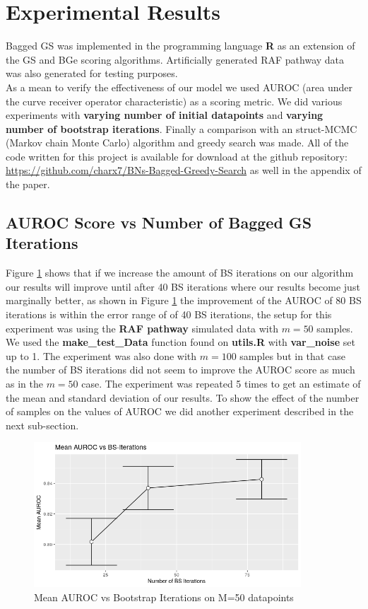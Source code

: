 \documentclass{article}
\begin{document}
	\section{Experimental Results}
	Bagged GS was implemented in the programming language \textbf{R} as an
	extension of the GS and BGe scoring algorithms. Artificially generated RAF
	pathway data was also generated for testing purposes. \\
	As a mean to verify the effectiveness of our model we used
	AUROC (area under the curve receiver operator characteristic) as a scoring
	metric. We did various experiments with \textbf{varying number of initial
	datapoints} and \textbf{varying number of bootstrap iterations}. Finally a
	comparison with an struct-MCMC (Markov chain Monte Carlo)  algorithm and
	greedy search was made. All of the code written for this project is available for download at
	the github repository: \url{https://github.com/charx7/BNs-Bagged-Greedy-Search} as well in the appendix of the paper.
	\subsection{AUROC Score vs Number of Bagged GS Iterations}
	Figure \ref{fig:aurocBsIterations} shows that if we increase the amount of BS iterations on our
	algorithm our results will improve until after 40 BS iterations where our
	results become just marginally better, as shown in
	Figure \ref{fig:aurocBsIterations} the improvement of the AUROC of 80 BS
	iterations is within the error range of of 40 BS
	iterations, the setup for this experiment was using
	the \textbf{RAF pathway} simulated data with $m=50$ samples. We used the
	\textbf{make\_test\_Data} function found on \textbf{utils.R} with \textbf{var\_noise} set up to 1. The experiment
	was also done with $m=100$ samples but in that case the number of BS
	iterations did not seem to improve the AUROC score as much as in the
	$m=50$ case. The experiment was repeated 5 times to get an estimate of the
	mean and standard deviation of our results. To show the effect of the number of samples on the values of
	AUROC we did another experiment described in the next sub-section.
	\begin{figure}[ht]
		\includegraphics[width=10cm]{meanAUROCvsBSIterations}
		\centering
		\caption{Mean AUROC vs Bootstrap Iterations on M=50 datapoints}
		\label{fig:aurocBsIterations}
	\end{figure}
\end{document}
